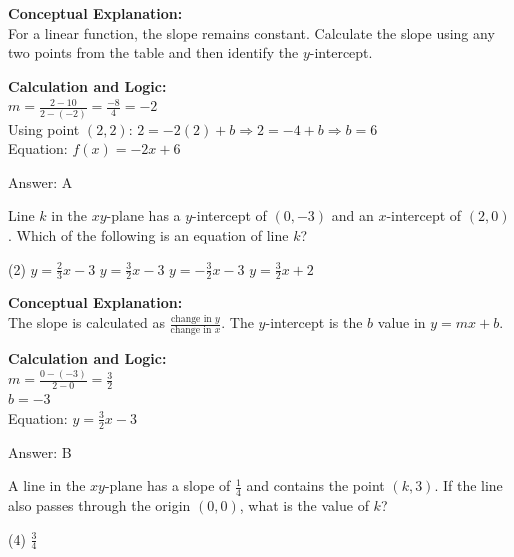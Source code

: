 \documentclass[11pt,paper=a4,answers]{exam}
\begin{document}
\begin{questions}
\begin{solution}
\textbf{Conceptual Explanation:} \\
For a linear function, the slope remains constant. Calculate the slope using any two points from the table and then identify the $y$-intercept.

\vspace{10pt}
\textbf{Calculation and Logic:} \\
$m = \frac{2 - 10}{2 - (-2)} = \frac{-8}{4} = -2$ \\
Using point $(2, 2)$: $2 = -2(2) + b \Rightarrow 2 = -4 + b \Rightarrow b = 6$ \\
Equation: $f(x) = -2x + 6$

\vspace{15pt}
Answer: \colorbox{yellow!100}{A}
\end{solution}

\vspace{20pt}

\question
Line $k$ in the $xy$-plane has a $y$-intercept of $(0, -3)$ and an $x$-intercept of $(2, 0)$. Which of the following is an equation of line $k$?
\begin{tasks}(2)
    \task $y = \frac{2}{3}x - 3$
    \task $y = \frac{3}{2}x - 3$
    \task $y = -\frac{3}{2}x - 3$
    \task $y = \frac{3}{2}x + 2$
\end{tasks}

\begin{solution}
\textbf{Conceptual Explanation:} \\
The slope is calculated as $\frac{\text{change in } y}{\text{change in } x}$. The $y$-intercept is the $b$ value in $y=mx+b$.

\vspace{10pt}
\textbf{Calculation and Logic:} \\
$m = \frac{0 - (-3)}{2 - 0} = \frac{3}{2}$ \\
$b = -3$ \\
Equation: $y = \frac{3}{2}x - 3$

\vspace{15pt}
Answer: \colorbox{yellow!100}{B}
\end{solution}

\vspace{20pt}

\question
A line in the $xy$-plane has a slope of $\frac{1}{4}$ and contains the point $(k, 3)$. If the line also passes through the origin $(0, 0)$, what is the value of $k$?
\begin{tasks}(4)
    \task $\frac{3}{4}$
\end{tasks}


\end{questions}
\end{document}

